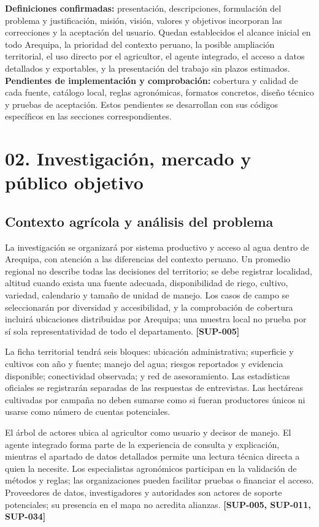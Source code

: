 \documentclass[10pt,a4paper]{article}
\begin{document}
\textbf{Definiciones confirmadas:} presentación, descripciones, formulación del problema y justificación, misión, visión, valores y objetivos incorporan las correcciones y la aceptación del usuario. Quedan establecidos el alcance inicial en todo Arequipa, la prioridad del contexto peruano, la posible ampliación territorial, el uso directo por el agricultor, el agente integrado, el acceso a datos detallados y exportables, y la presentación del trabajo sin plazos estimados. \textbf{Pendientes de implementación y comprobación:} cobertura y calidad de cada fuente, catálogo local, reglas agronómicas, formatos concretos, diseño técnico y pruebas de aceptación. Estos pendientes se desarrollan con sus códigos específicos en las secciones correspondientes.


\clearpage\section{02. Investigación, mercado y público objetivo}\label{02-investigación-mercado-y-público-objetivo}

\subsection{Contexto agrícola y análisis del problema}

La investigación se organizará por sistema productivo y acceso al agua dentro de Arequipa, con atención a las diferencias del contexto peruano. Un promedio regional no describe todas las decisiones del territorio; se debe registrar localidad, altitud cuando exista una fuente adecuada, disponibilidad de riego, cultivo, variedad, calendario y tamaño de unidad de manejo. Los casos de campo se seleccionarán por diversidad y accesibilidad, y la comprobación de cobertura incluirá ubicaciones distribuidas por Arequipa; una muestra local no prueba por sí sola representatividad de todo el departamento. \textbf{[SUP-005]}


La ficha territorial tendrá seis bloques: ubicación administrativa; superficie y cultivos con año y fuente; manejo del agua; riesgos reportados y evidencia disponible; conectividad observada; y red de asesoramiento. Las estadísticas oficiales se registrarán separadas de las respuestas de entrevistas. Las hectáreas cultivadas por campaña no deben sumarse como si fueran productores únicos ni usarse como número de cuentas potenciales.


El árbol de actores ubica al agricultor como usuario y decisor de manejo. El agente integrado forma parte de la experiencia de consulta y explicación, mientras el apartado de datos detallados permite una lectura técnica directa a quien la necesite. Los especialistas agronómicos participan en la validación de métodos y reglas; las organizaciones pueden facilitar pruebas o financiar el acceso. Proveedores de datos, investigadores y autoridades son actores de soporte potenciales; su presencia en el mapa no acredita alianzas. \textbf{[SUP-005, SUP-011, SUP-034]}
\end{document}
